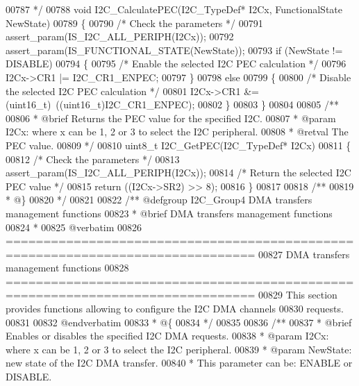 \begin{DoxyCode}
00787 \textcolor{comment}{  */}
00788 \textcolor{keywordtype}{void} I2C_CalculatePEC(I2C\_TypeDef* I2Cx, FunctionalState NewState)
00789 \{
00790   \textcolor{comment}{/* Check the parameters */}
00791   assert_param(IS\_I2C\_ALL\_PERIPH(I2Cx));
00792   assert_param(IS\_FUNCTIONAL\_STATE(NewState));
00793   \textcolor{keywordflow}{if} (NewState != DISABLE)
00794   \{
00795     \textcolor{comment}{/* Enable the selected I2C PEC calculation */}
00796     I2Cx->CR1 |= I2C_CR1_ENPEC;
00797   \}
00798   \textcolor{keywordflow}{else}
00799   \{
00800     \textcolor{comment}{/* Disable the selected I2C PEC calculation */}
00801     I2Cx->CR1 &= (uint16\_t)~((uint16\_t)I2C_CR1_ENPEC);
00802   \}
00803 \}
00804 
00805 \textcolor{comment}{/**}
00806 \textcolor{comment}{  * @brief  Returns the PEC value for the specified I2C.}
00807 \textcolor{comment}{  * @param  I2Cx: where x can be 1, 2 or 3 to select the I2C peripheral.}
00808 \textcolor{comment}{  * @retval The PEC value.}
00809 \textcolor{comment}{  */}
00810 uint8\_t I2C_GetPEC(I2C\_TypeDef* I2Cx)
00811 \{
00812   \textcolor{comment}{/* Check the parameters */}
00813   assert_param(IS\_I2C\_ALL\_PERIPH(I2Cx));
00814   \textcolor{comment}{/* Return the selected I2C PEC value */}
00815   \textcolor{keywordflow}{return} ((I2Cx->SR2) >> 8);
00816 \}
00817 
00818 \textcolor{comment}{/**}
00819 \textcolor{comment}{  * @\}}
00820 \textcolor{comment}{  */}
00821 
00822 \textcolor{comment}{/** @defgroup I2C\_Group4 DMA transfers management functions}
00823 \textcolor{comment}{ *  @brief   DMA transfers management functions }
00824 \textcolor{comment}{ *}
00825 \textcolor{comment}{@verbatim   }
00826 \textcolor{comment}{ ===============================================================================}
00827 \textcolor{comment}{                         DMA transfers management functions}
00828 \textcolor{comment}{ ===============================================================================  }
00829 \textcolor{comment}{  This section provides functions allowing to configure the I2C DMA channels }
00830 \textcolor{comment}{  requests.}
00831 \textcolor{comment}{  }
00832 \textcolor{comment}{@endverbatim}
00833 \textcolor{comment}{  * @\{}
00834 \textcolor{comment}{  */}
00835 
00836 \textcolor{comment}{/**}
00837 \textcolor{comment}{  * @brief  Enables or disables the specified I2C DMA requests.}
00838 \textcolor{comment}{  * @param  I2Cx: where x can be 1, 2 or 3 to select the I2C peripheral.}
00839 \textcolor{comment}{  * @param  NewState: new state of the I2C DMA transfer.}
00840 \textcolor{comment}{  *          This parameter can be: ENABLE or DISABLE.}

\end{DoxyCode}
